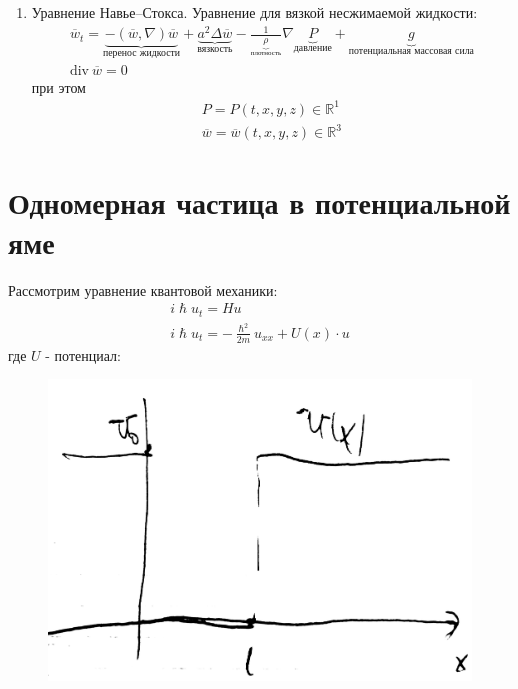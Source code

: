 \begin{enumerate}

	\item{
			Уравнение Навье--Стокса. Уравнение для вязкой несжимаемой жидкости:
			\[
				\begin{aligned}
				\overline{w}_t = \underbrace{-\left( \overline{w}, \nabla\right) \overline{w}}_{\text{перенос жидкости}} + \underbrace{a^2 \Delta \overline{w}}_\text{вязкость} - \frac{1}{\underbrace{\rho}_{\text{плотность}}} \nabla \underbrace{P}_{\text{давление}} + \underbrace{g}_{\text{потенциальная массовая сила}} \\
				\mathrm{div} ~ \overline{w} = 0
			\end{aligned}
			\]
			при этом
			\[
				\begin{aligned}
					P = P(t,x,y,z) \in \mathbb{R}^1 \\
					\overline{w} = \overline{w} (t,x,y,z) \in \mathbb{R}^3
				\end{aligned}
			\]
		}
\end{enumerate}
\section{Одномерная частица в потенциальной яме}
Рассмотрим уравнение квантовой механики:
\[
	\begin{aligned}
	i \hslash u_t = Hu \\
	i \hslash u_t = -\frac{\hslash^2}{2m} u_{xx} + U(x) \cdot u
\end{aligned}
\]
где $U$ - потенциал:

\begin{figure}[H]
\includegraphics[width=\textwidth]{3}
\end{figure}

